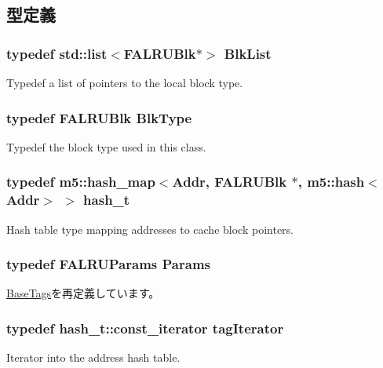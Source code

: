 \subsection{型定義}
\hypertarget{classFALRU_ae5eda55657abbfe7eda0b6d87a1eb18f}{
\subsubsection[{BlkList}]{\setlength{\rightskip}{0pt plus 5cm}typedef {\bf std::list}$<${\bf FALRUBlk}$\ast$$>$ {\bf BlkList}}}
\label{classFALRU_ae5eda55657abbfe7eda0b6d87a1eb18f}
Typedef a list of pointers to the local block type. \hypertarget{classFALRU_a484db1f477d317f6694973b77f1e3ab1}{
\subsubsection[{BlkType}]{\setlength{\rightskip}{0pt plus 5cm}typedef {\bf FALRUBlk} {\bf BlkType}}}
\label{classFALRU_a484db1f477d317f6694973b77f1e3ab1}
Typedef the block type used in this class. \hypertarget{classFALRU_adac55c74efec4bdd54e5042924e5cd4d}{
\subsubsection[{hash\_\-t}]{\setlength{\rightskip}{0pt plus 5cm}typedef m5::hash\_\-map$<${\bf Addr}, {\bf FALRUBlk} $\ast$, m5::hash$<${\bf Addr}$>$ $>$ {\bf hash\_\-t}}}
\label{classFALRU_adac55c74efec4bdd54e5042924e5cd4d}
Hash table type mapping addresses to cache block pointers. \hypertarget{classFALRU_ac02f095611cbe1cc1b0d89ce95694168}{
\subsubsection[{Params}]{\setlength{\rightskip}{0pt plus 5cm}typedef FALRUParams {\bf Params}}}
\label{classFALRU_ac02f095611cbe1cc1b0d89ce95694168}


\hyperlink{classBaseTags_aab33a5313a7ca07c69f8a4e6e1490375}{BaseTags}を再定義しています。\hypertarget{classFALRU_a6b2dee7e09394d1cc2e986975c29fade}{
\subsubsection[{tagIterator}]{\setlength{\rightskip}{0pt plus 5cm}typedef hash\_\-t::const\_\-iterator {\bf tagIterator}}}
\label{classFALRU_a6b2dee7e09394d1cc2e986975c29fade}
Iterator into the address hash table. 

